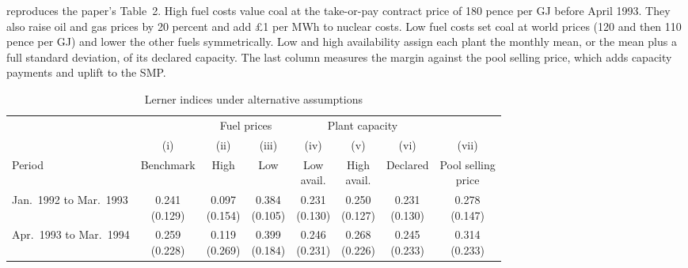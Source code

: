  reproduces the paper's Table~2. High fuel costs value coal at the take-or-pay contract price
of 180 pence per GJ before April 1993. They also raise oil and gas prices by 20 percent and add \pounds 1 per MWh to
nuclear costs.
Low fuel costs set coal at world prices (120 and then 110 pence per GJ) and lower the other fuels symmetrically. Low and
high availability assign each plant the monthly mean, or the mean plus a full standard deviation, of its declared
capacity. The last column measures the margin against the pool selling price, which adds capacity payments and uplift
to the SMP.

\begin{table}[htbp]
\centering
\begin{threeparttable}
\caption{Lerner indices under alternative assumptions}
\label{tab:03-wolfram-robust}
\small
\setlength{\tabcolsep}{4pt}
\begin{tabular}{@{}lccccccc@{}}
\toprule
& & \multicolumn{2}{c}{Fuel prices} & \multicolumn{3}{c}{Plant capacity} & \\
\cmidrule(lr){3-4}\cmidrule(lr){5-7}
& (i) & (ii) & (iii) & (iv) & (v) & (vi) & (vii) \\
Period & Benchmark & High & Low & \makecell{Low\\avail.} & \makecell{High\\avail.} & Declared &
  \makecell{Pool selling\\price} \\
\midrule
Jan.\ 1992 to Mar.\ 1993 & \makecell{0.241\\(0.129)} & \makecell{0.097\\(0.154)} & \makecell{0.384\\(0.105)} &
  \makecell{0.231\\(0.130)} & \makecell{0.250\\(0.127)} & \makecell{0.231\\(0.130)} & \makecell{0.278\\(0.147)} \\
\addlinespace
Apr.\ 1993 to Mar.\ 1994 & \makecell{0.259\\(0.228)} & \makecell{0.119\\(0.269)} & \makecell{0.399\\(0.184)} &
  \makecell{0.246\\(0.231)} & \makecell{0.268\\(0.226)} & \makecell{0.245\\(0.233)} & \makecell{0.314\\(0.233)} \\

\end{tabular}
\end{threeparttable}
\end{table}
